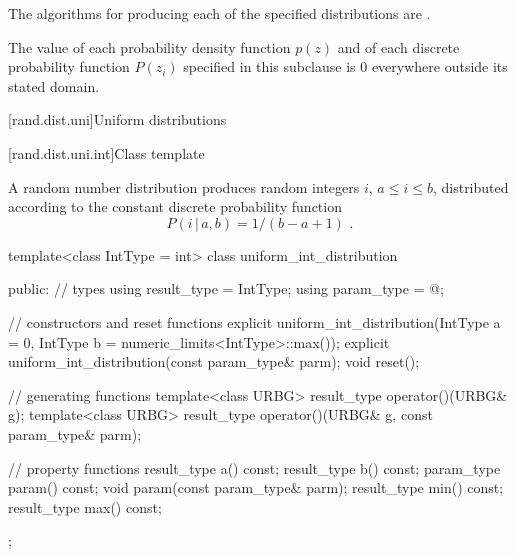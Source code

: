 \pnum
The algorithms for producing each
of the specified distributions are
.

\pnum
The value of each probability density function $p(z)$
and of each discrete probability function $P(z_i)$
specified in this subclause
is $0$
everywhere outside its stated domain.


[rand.dist.uni]{Uniform distributions}%
%


[rand.dist.uni.int]{Class template }%
%
%

\pnum
A  random number distribution
produces random integers $i$,
$a \leq i \leq b$,
distributed according to
the constant discrete probability function%
%
%
\[  P(i\,|\,a,b) = 1 / (b - a + 1) \text{ .} \]

%
\begin{codeblock}
template<class IntType = int>
  class uniform_int_distribution {
  public:
    // types
    using result_type = IntType;
    using param_type  = @\unspec@;

    // constructors and reset functions
    explicit uniform_int_distribution(IntType a = 0, IntType b = numeric_limits<IntType>::max());
    explicit uniform_int_distribution(const param_type& parm);
    void reset();

    // generating functions
    template<class URBG>
      result_type operator()(URBG& g);
    template<class URBG>
      result_type operator()(URBG& g, const param_type& parm);

    // property functions
    result_type a() const;
    result_type b() const;
    param_type param() const;
    void param(const param_type& parm);
    result_type min() const;
    result_type max() const;
  };
\end{codeblock}


